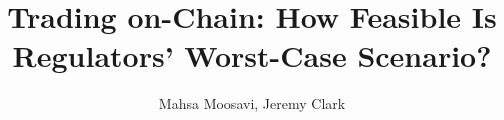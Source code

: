 \documentclass[sigconf,anonymous=true]{acmart}
\begin{document}

\title{Trading on-Chain: How Feasible Is Regulators' Worst-Case Scenario?}


\author{Mahsa Moosavi, Jeremy Clark}







\maketitle









%





\end{document}
